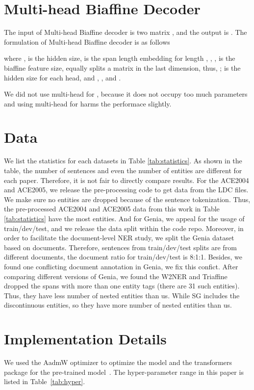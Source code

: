 \documentclass[11pt]{article}
\begin{document}
\begin{table*}[!ht]
\section{Multi-head Biaffine Decoder}
The input of Multi-head Biaffine decoder is two matrix , and the output is . The formulation of Multi-head Biaffine decoder is as follows

where ,  is the hidden size,  is the span length embedding for length , , ,  is the biaffine feature size,  equally splits a matrix in the last dimension, thus, ;  is the hidden size for each head, and , , and .

We did not use multi-head for , because it does not occupy too much parameters and using multi-head for  harms the performace slightly.

\section{Data}
We list the statistics for each datasets in Table \ref{tab:statistics}. As shown in the table, the number of sentences and even the number of entities are different for each paper. Therefore, it is not fair to directly compare results. For the ACE2004 and ACE2005, we release the pre-processing code to get data from the LDC files. We make sure no entities are dropped because of the sentence tokenization. Thus, the pre-processed ACE2004 and ACE2005 data from this work in Table \ref{tab:statistics} have the most entities. And for Genia, we appeal for the usage of train/dev/test, and we release the data split within the code repo. Moreover, in order to facilitate the document-level NER study, we split the Genia dataset based on documents. Therefore, sentences from train/dev/test splits are from different documents, the document ratio for train/dev/test is 8:1:1. Besides, we found one conflicting document annotation in Genia, we fix this confict. After comparing different versions of Genia, we found the W2NER \cite{DBLP:conf/aaai/Li00WZTJL22} and Triaffine \cite{DBLP:conf/acl/0002THH22} dropped the spans with more than one entity tags (there are 31 such entities). Thus, they have less number of nested entities than us. While SG \cite{DBLP:conf/acl/WanR0022} includes the discontinuous entities, so they have more number of nested entities than us.



\section{Implementation Details}
We used the AadmW optimizer to optimize the model and the transformers package for the pre-trained model~\cite{wolf-etal-2020-transformers}. 
The hyper-parameter range in this paper is listed in Table~\ref{tab:hyper}.




\end{table*}
\end{document}
